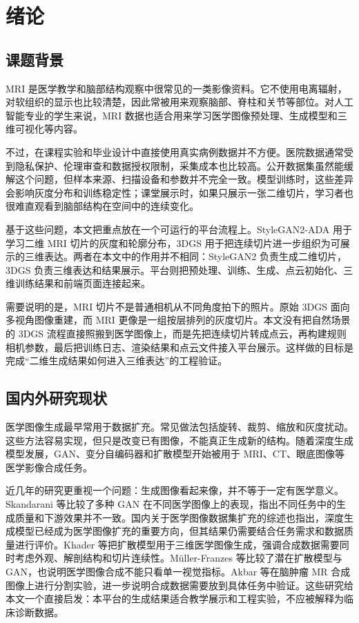 \chapter{绪论}

\section{课题背景}
MRI 是医学教学和脑部结构观察中很常见的一类影像资料。它不使用电离辐射，对软组织的显示也比较清楚，因此常被用来观察脑部、脊柱和关节等部位。对人工智能专业的学生来说，MRI 数据也适合用来学习医学图像预处理、生成模型和三维可视化等内容。

不过，在课程实验和毕业设计中直接使用真实病例数据并不方便。医院数据通常受到隐私保护、伦理审查和数据授权限制，采集成本也比较高。公开数据集虽然能缓解这个问题，但样本来源、扫描设备和参数并不完全一致。模型训练时，这些差异会影响灰度分布和训练稳定性；课堂展示时，如果只展示一张二维切片，学习者也很难直观看到脑部结构在空间中的连续变化。

基于这些问题，本文把重点放在一个可运行的平台流程上。StyleGAN2-ADA 用于学习二维 MRI 切片的灰度和轮廓分布\cite{karras2020stylegan2,karras2020ada}，3DGS 用于把连续切片进一步组织为可展示的三维表达\cite{kerbl20233dgs}。两者在本文中的作用并不相同：StyleGAN2 负责生成二维切片，3DGS 负责三维表达和结果展示。平台则把预处理、训练、生成、点云初始化、三维训练结果和前端页面连接起来。

需要说明的是，MRI 切片不是普通相机从不同角度拍下的照片。原始 3DGS 面向多视角图像重建，而 MRI 更像是一组按层排列的灰度切片。本文没有把自然场景的 3DGS 流程直接照搬到医学图像上，而是先把连续切片转成点云，再构建规则相机参数，最后把训练日志、渲染结果和点云文件接入平台展示。这样做的目标是完成“二维生成结果如何进入三维表达”的工程验证。

\section{国内外研究现状}
医学图像生成最早常用于数据扩充。常见做法包括旋转、裁剪、缩放和灰度扰动。这些方法容易实现，但只是改变已有图像，不能真正生成新的结构。随着深度生成模型发展，GAN、变分自编码器和扩散模型开始被用于 MRI、CT、眼底图像等医学影像合成任务。

近几年的研究更重视一个问题：生成图像看起来像，并不等于一定有医学意义。Skandarani 等比较了多种 GAN 在不同医学图像上的表现，指出不同任务中的生成质量和下游效果并不一致\cite{skandarani2023gans}。国内关于医学图像数据集扩充的综述也指出，深度生成模型已经成为医学图像扩充的重要方向，但其结果仍需要结合任务需求和数据质量进行评价\cite{chen2023medicalaugment}。Khader 等把扩散模型用于三维医学图像生成，强调合成数据需要同时考虑外观、解剖结构和切片连续性\cite{khader2023ddpm3d}。Müller-Franzes 等比较了潜在扩散模型与 GAN，也说明医学图像合成不能只看单一视觉指标\cite{mullerfranzes2023comparison}。Akbar 等在脑肿瘤 MR 合成图像上进行分割实验，进一步说明合成数据需要放到具体任务中验证\cite{akbar2024syntheticmr}。这些研究给本文一个直接启发：本平台的生成结果适合教学展示和工程实验，不应被解释为临床诊断数据。

